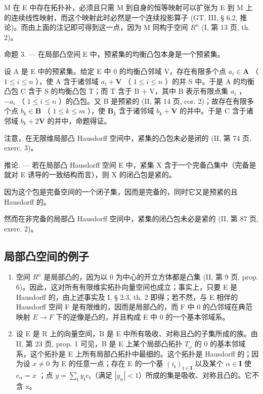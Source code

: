 M 在 E 中存在拓扑补，必须且只需 M 到自身的恒等映射可以扩张为 E 到 M 上的连续线性映射，而这个映射此时必然是一个连续投影算子 (GT, III, § 6.2, 推论)。而由上面的注记即可得到这一点，因为 M 同构于空间 \(R^{n}\) (I, 第 13 页, th. 2)。

命题 3. --- 在局部凸空间 E 中，预紧集的均衡凸包本身是一个预紧集。

设 A 是 E 中的预紧集。给定 E 中 0 的均衡凸邻域 V，存在有限多个点 \(a_i \in \mathbf{A}\) （ \(1 \leqslant i \leqslant n\) ），使 A 含于诸邻域 \(a_i + \mathbf{V}\) （ \(1 \leqslant i \leqslant n\) ）的并 S 中。于是 A 的均衡凸包 C 含于 S 的均衡凸包 T；而 T 含于 B + V，其中 B 表示有限点集 \(a_i\) ， \(-a_i\) （ \(1 \leqslant i \leqslant n\) ）的凸包。又 B 是预紧的 (II, 第 14 页, cor. 2)；故存在有限多个点 \(b_k \in \mathbf{B}\) （ \(1 \leqslant k \leqslant m\) ），使 \(\mathbf{B}_k\) 含于诸邻域 \(b_k + \mathbf{V}\) 的并中。于是 C 含于诸邻域 \(b_k + 2\mathbf{V}\) 的并中，命题得证。

注意，在无限维局部凸 Hausdorff 空间中，紧集的凸包未必是闭的 (II, 第 74 页, exerc. 3)。

推论. --- 若在局部凸 Hausdorff 空间 E 中，紧集 X 含于一个完备凸集中（完备是就对 E 诱导的一致结构而言），则 X 的闭凸包是紧的。

因为这个包是完备空间的一个闭子集，因而是完备的，同时它又是预紧的且 Hausdorff 的。

然而在非完备的局部凸 Hausdorff 空间中，紧集的闭凸包未必是紧的 (II, 第 87 页, exerc. 2)。

\subsection{局部凸空间的例子}

\begin{enumerate}
\def\labelenumi{\arabic{enumi})}
\item
  空间 \(R^{n}\) 是局部凸的，因为以 0 为中心的开立方体都是凸集 (II, 第 9 页, prop. 6)。因此，这对所有有限维实拓扑向量空间也成立；事实上，只要 E 是 Hausdorff 的，由上述事实及 I, § 2.3, th. 2 即得；若不然，与 E 相伴的 Hausdorff 空间 F 是有限维的，因而是局部凸的，而 F 中 0 的凸邻域在典范映射 \(E \rightarrow F\) 下的逆像是凸的，并且构成 E 中 0 的一个基本邻域系。
\item
  设 E 是 R 上的向量空间，B 是 E 中所有吸收、对称且凸的子集所成的族。由 II, 第 23 页, prop. 1 可见，B 是 E 上某个局部凸拓扑 \(T_{\omega}\) 的 0 的基本邻域系，这个拓扑是 E 上所有局部凸拓扑中最细的。这个拓扑是 Hausdorff 的；因为设 \(x \neq 0\) 为 E 的任意一点；存在 E 的一个基 \((i_{\mathfrak{t}})_{\mathfrak{t} \in \mathbf{I}}\) 以及某个 \(\alpha \in \mathbf{I}\) 使 \(e_{\alpha} = x\) ；点 \(y = \sum_{\mathfrak{t}} y_{\mathfrak{t}} e_{\mathfrak{t}}\)（满足 \(|y_{\alpha}| < 1\)）所成的集是吸收、对称且凸的。它不含 x。
\end{enumerate}

